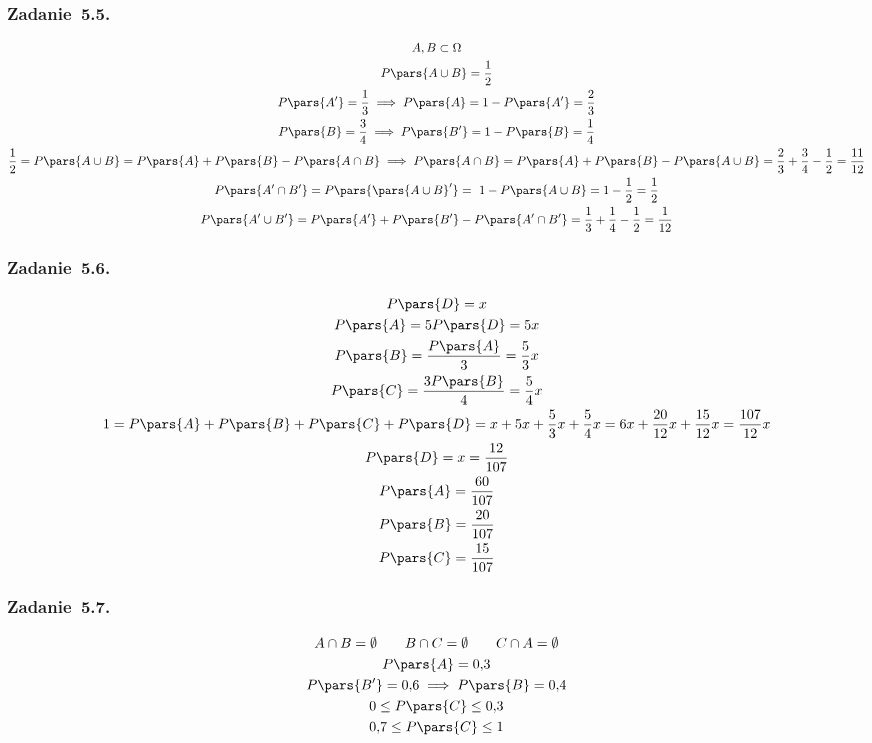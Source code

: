 \subsubsection*{Zadanie~5.5.}
\begin{gather*}
    A, B \subset \Omega\\
    P\pars{A \cup B} = \frac{1}{2}\\
    P\pars{A'} = \frac{1}{3} \implies P\pars{A}
        = 1 - P\pars{A'}
        = \frac{2}{3}\\
    P\pars{B} = \frac{3}{4} \implies P\pars{B'} = 1 - P\pars{B}
        = \frac{1}{4}\\
    \frac{1}{2}
        = P\pars{A \cup B} = P\pars{A} + P\pars{B} - P\pars{A \cap B} \implies P\pars{A \cap B} = P\pars{A} + P\pars{B} - P\pars{A \cup B} = \frac{2}{3} + \frac{3}{4} - \frac{1}{2} = \frac{11}{12}\\
    P\pars{A' \cap B'} = P\pars{\pars{A \cup B}'}
        = 1 - P\pars{A \cup B}
        = 1 - \frac{1}{2}
        = \frac{1}{2}\\
    P\pars{A' \cup B'}
        = P\pars{A'} + P\pars{B'} - P\pars{A' \cap B'}
        = \frac{1}{3} + \frac{1}{4} - \frac{1}{2}
        = \frac{1}{12}
\end{gather*}
\subsubsection*{Zadanie~5.6.}
\begin{gather*}
    P\pars{D} = x\\
    P\pars{A} = 5P\pars{D} = 5x\\
    P\pars{B} = \frac{P\pars{A}}{3} = \frac{5}{3}x\\
    P\pars{C} = \frac{3P\pars{B}}{4} = \frac{5}{4}x\\
    1
        = P\pars{A} + P\pars{B} + P\pars{C} + P\pars{D}
        = x + 5x + \frac{5}{3}x + \frac{5}{4}x
        = 6x + \frac{20}{12}x + \frac{15}{12}x
        = \frac{107}{12}x\\
    P\pars{D} = x = \frac{12}{107}\\
    P\pars{A} = \frac{60}{107}\\
    P\pars{B} = \frac{20}{107}\\
    P\pars{C} = \frac{15}{107}
\end{gather*}
\subsubsection*{Zadanie~5.7.}
\begin{gather*}
    A \cap B = \emptyset \qquad B \cap C = \emptyset \qquad C \cap A = \emptyset\\
    P\pars{A} = 0{,}3\\
    P\pars{B'} = 0{,}6 \implies P\pars{B} = 0{,}4\\
    0 \leq P\pars{C} \leq 0{,}3\\
    0{,}7 \leq P\pars{C} \leq 1
\end{gather*}
